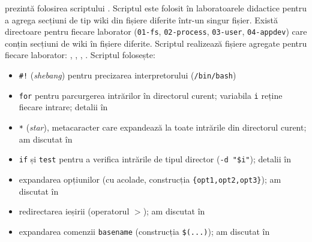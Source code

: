 prezintă folosirea scriptului .
Scriptul este folosit în laboratoarele didactice pentru a agrega secțiuni de tip wiki din fișiere diferite într-un singur fișier.
Există directoare pentru fiecare laborator (\texttt{01-fs}, \texttt{02-process}, \texttt{03-user}, \texttt{04-appdev}) care conțin secțiuni de wiki în fișiere diferite.
Scriptul realizează fișiere agregate pentru fiecare laborator: , , , .
Scriptul folosește:
\begin{itemize}
  \item \texttt{\#!} (\textit{shebang}) pentru precizarea interpretorului (\texttt{/bin/bash})
  \item \texttt{for} pentru parcurgerea intrărilor în directorul curent; variabila \texttt{i} reține fiecare intrare; detalii în 
  \item \texttt{*} (\textit{star}), metacaracter care expandează la toate intrările din directorul curent; am discutat în 
  \item \texttt{if} și \texttt{test} pentru a verifica intrările de tipul director (\texttt{-d "\$i"}); detalii în 
  \item expandarea opțiunilor (cu acolade, construcția \verb|{opt1,opt2,opt3}|); am discutat în 
  \item redirectarea ieșirii (operatorul \texttt{$>$}); am discutat în 
  \item expandarea comenzii \texttt{basename} (construcția \verb|$(...)|); am discutat în 
\end{itemize}

